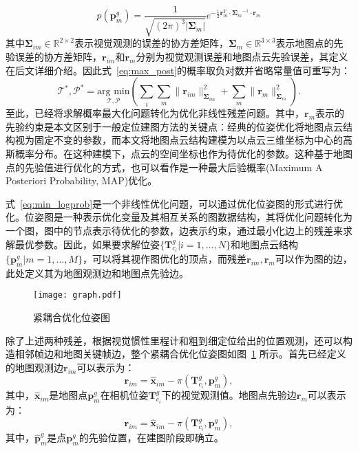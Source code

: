 \begin{equation}
  p(\symbf{p}_m^g) = \frac{1}{\sqrt{(2\pi)^3|\symbf{\Sigma}_m|}}e^{-\frac{1}{2}\symbf{r}_{m}^T \cdot {\symbf{\Sigma}_{m}}^{-1} \cdot \symbf{r}_{m}}
\end{equation}
其中$\symbf{\Sigma}_{im}\in \mathbb{R}^{2\times 2}$表示视觉观测的误差的协方差矩阵，$\symbf{\Sigma}_{m} \in \mathbb{R}^{3 \times 3}$表示地图点的先验误差的协方差矩阵，$\symbf{r}_{im}$和$\symbf{r}_m$分别为视觉观测误差和地图点云先验误差，其定义在后文详细介绍。因此式~\eqref{eq:max_post}的概率取负对数并省略常量值可重写为：
\begin{equation}
\label{eq:min_logprob}
\mathcal{T}^*, \mathcal{P}^* = \underset{\mathcal{T}, \mathcal{P}}{\text{arg min}} \left( \sum_i \sum_m \| \symbf{r}_{im} \|_{\symbf{\Sigma}_{im}}^2 + \sum_m \| \symbf{r}_m \|_{\symbf{\Sigma}_{m}}^2 \right).
\end{equation}
至此，已经将求解概率最大化问题转化为优化非线性残差问题。其中，$\symbf{r}_{m}$表示的先验约束是本文区别于一般定位建图方法的关键点：经典的位姿优化将地图点云结构视为固定不变的参数，而本文将地图点云结构建模为以点云三维坐标为中心的高斯概率分布。在这种建模下，点云的空间坐标也作为待优化的参数。这种基于地图点的先验值进行优化的方式，也可以看作是一种最大后验概率(Maximum A Posteriori Probability, MAP)优化。

式~\eqref{eq:min_logprob}是一个非线性优化问题，可以通过优化位姿图的形式进行优化。位姿图是一种表示优化变量及其相互关系的图数据结构，其将优化问题转化为一个图，图中的节点表示待优化的参数，边表示约束，通过最小化边上的残差来求解最优参数。因此，如果要求解位姿$\{ \symbf{T}_{c_i}^g | i=1,\dots, N\}$和地图点云结构$\{\symbf{p}^g_m | m = 1, \dots, M\}$，可以将其视作图优化的顶点，而残差$\symbf{r}_{im}, \symbf{r}_m$可以作为图的边，此处定义其为地图观测边和地图点先验边。

\begin{figure}
  \centering
  \texttt{[image: graph.pdf]}
  \caption{紧耦合优化位姿图}
  \label{fig:graph}
\end{figure}

除了上述两种残差，根据视觉惯性里程计和粗到细定位给出的位置观测，还可以构造相邻帧边和地图关键帧边，整个紧耦合优化位姿图如图~\ref{fig:graph} 所示。首先已经定义的地图观测边$\symbf{r}_{im}$可以表示为：
\begin{equation}
  \symbf{r}_{im} = \hat{\symbf{x}}_{im} - \pi(\symbf{T}_{c_{i}}^g, \symbf{p}^g_m),
\end{equation}
其中，$\hat{\symbf{x}}_{im}$是地图点$\symbf{p}^g_m$在相机位姿$\symbf{T}_{c_{i}}^g$下的视觉观测值。地图点先验边$\symbf{r}_m$可以表示为：
\begin{equation}
  \symbf{r}_{im} = \hat{\symbf{x}}_{im} - \pi(\symbf{T}_{c_{i}}^g, \symbf{p}^g_m),
\end{equation}
其中，$\hat{\symbf{p}}^g_m$是点$\symbf{p}^g_m$的先验位置，在建图阶段即确立。

